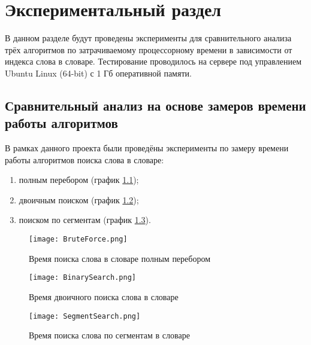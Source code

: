 \chapter{Экспериментальный раздел}
\label{cha:research}
    В данном разделе будут проведены эксперименты 
    для сравнительного анализа трёх алгоритмов по затрачиваемому процессорному 
    времени в зависимости от индекса слова в словаре.
    Тестирование проводилось на сервере
    под управлением Ubuntu Linux (64-bit) с 1 Гб оперативной памяти.

    \section{Сравнительный анализ на основе замеров времени работы алгоритмов}
        В рамках данного проекта были проведёны эксперименты
        по замеру времени работы алгоритмов поиска слова в словаре:
        \begin{enumerate}
            \item полным перебором (график \ref{graph:test:brute-force});
            \item двоичным поиском (график \ref{graph:test:binary});
            \item поиском по сегментам (график \ref{graph:test:segment}).
        \end{enumerate}

        \begin{figure}[h!]
            \centering
                \texttt{[image: BruteForce.png]}
                \caption{Время поиска слова в словаре полным перебором}
                \label{graph:test:brute-force}
        \end{figure}


        
        \begin{figure}[h!]
            \centering
                \texttt{[image: BinarySearch.png]}
                \caption{Время двоичного поиска слова в словаре}
                \label{graph:test:binary}
        \end{figure}

        \begin{figure}[h!]
            \centering
                \texttt{[image: SegmentSearch.png]}
                \caption{Время поиска слова по сегментам в словаре}
                \label{graph:test:segment}
        \end{figure}

